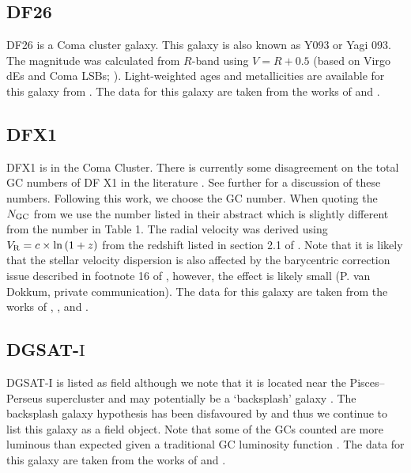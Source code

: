 \subsection{DF26}
DF26 is a Coma cluster galaxy. This galaxy is also known as Y093 or Yagi 093. The magnitude was calculated from $R$-band using $V = R + 0.5$ (based on Virgo dEs and Coma LSBs; \citealp{vanZee2004, Alabi2020}). Light-weighted ages and metallicities are available for this galaxy from \citet{RuizLara2018}. The data for this galaxy are taken from the works of \citet{Yagi2016, Alabi2018, Lim2018} and \citet{FerreMateu2018}. 

\subsection{DFX1}
DFX1 is in the Coma Cluster. There is currently some disagreement on the total GC numbers of DF X1 in the literature \citep{Saifollahi2021, Saifollahi2022}. See further \citet{Forbes2024} for a discussion of these numbers. Following this work, we choose the \citet{vanDokkum2017} GC number. When quoting the $N_{\rm GC}$ from \citet{vanDokkum2017} we use the number listed in their abstract which is slightly different from the number in Table 1. The radial velocity was derived using $V_{\rm R} = c \times \ln{(1+z)}$ from the redshift listed in section 2.1 of \cite{vanDokkum2017}. Note that it is likely that the stellar velocity dispersion is also affected by the barycentric correction issue described in footnote 16 of \cite{vanDokkum2019b}, however, the effect is likely small (P. van Dokkum, private communication). The data for this galaxy are taken from the works of \citet{vanDokkum2017}, \citet{Gannon2021}, \citet{Saifollahi2022} and \citet{FerreMateu2023}. 

\subsection{DGSAT-$\mathrm{I}$}
DGSAT-$\mathrm{I}$ is listed as field although we note that it is located near the Pisces--Perseus supercluster and may potentially be a `backsplash' galaxy \citep{MartinezDelgado2016, Papastergis2017, Benavides2021}. The backsplash galaxy hypothesis has been disfavoured by \citet{Janssens2022} and thus we continue to list this galaxy as a field object. Note that some of the GCs counted are more luminous than expected given a traditional GC luminosity function \citep{Janssens2022}. The data for this galaxy are taken from the works of \citet{MartinezDelgado2016, MartinNavarro2019} and \citet{Janssens2022}. 

